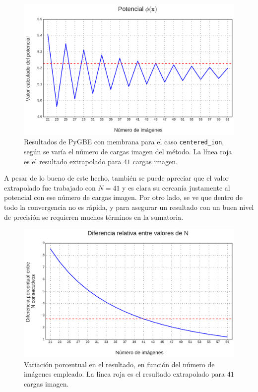 \documentclass[12pt, twoside, onehalfspace, numbers, spanish]{ezthesis}
\numberwithin{equation}{section}
\begin{document}
\begin{figure}[h]
	\centering
	\includegraphics[scale = 0.5]{./Figures/Potencial}
	\caption{Resultados de PyGBE con membrana para el caso \texttt{centered\_ion}, según se varía el número de cargas imagen del método. La línea roja es el resultado extrapolado para $41$ cargas imagen.}\label{graph:Potencial}
\end{figure}
\noindent
A pesar de lo bueno de este hecho, también se puede apreciar que el valor extrapolado fue trabajado con $N=41$ y es clara su cercanía justamente al potencial con ese número de cargas imagen. Por otro lado, se ve que dentro de todo la convergencia no es rápida, y para asegurar un resultado con un buen nivel de precisión se requieren muchos términos en la sumatoria.
\begin{figure}[h]
	\centering
	\includegraphics[scale = 0.5]{./Figures/Error}
	\caption{Variación porcentual en el resultado, en función del número de imágenes empleado. La línea roja es el resultado extrapolado para $41$ cargas imagen.}\label{graph:Error}
\end{figure}
\end{document}
